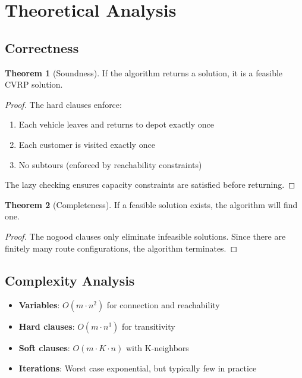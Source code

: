 \documentclass[12pt,a4paper]{article}
\theoremstyle{definition}
\newtheorem{theorem}{Theorem}[section]
\begin{document}
\section{Theoretical Analysis}

\subsection{Correctness}

\begin{theorem}[Soundness]
If the algorithm returns a solution, it is a feasible CVRP solution.
\end{theorem}

\begin{proof}
The hard clauses enforce:
\begin{enumerate}
    \item Each vehicle leaves and returns to depot exactly once
    \item Each customer is visited exactly once
    \item No subtours (enforced by reachability constraints)
\end{enumerate}
The lazy checking ensures capacity constraints are satisfied before returning.
\end{proof}

\begin{theorem}[Completeness]
If a feasible solution exists, the algorithm will find one.
\end{theorem}

\begin{proof}
The nogood clauses only eliminate infeasible solutions. Since there are finitely many route configurations, the algorithm terminates.
\end{proof}

\subsection{Complexity Analysis}

\begin{itemize}
    \item \textbf{Variables}: $O(m \cdot n^2)$ for connection and reachability
    \item \textbf{Hard clauses}: $O(m \cdot n^3)$ for transitivity
    \item \textbf{Soft clauses}: $O(m \cdot K \cdot n)$ with K-neighbors
    \item \textbf{Iterations}: Worst case exponential, but typically few in practice
\end{itemize}
\end{document}

